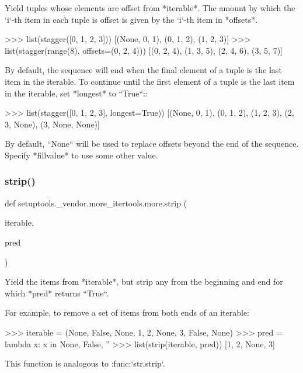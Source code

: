\begin{DoxyVerb}Yield tuples whose elements are offset from *iterable*.
The amount by which the `i`-th item in each tuple is offset is given by
the `i`-th item in *offsets*.

    >>> list(stagger([0, 1, 2, 3]))
    [(None, 0, 1), (0, 1, 2), (1, 2, 3)]
    >>> list(stagger(range(8), offsets=(0, 2, 4)))
    [(0, 2, 4), (1, 3, 5), (2, 4, 6), (3, 5, 7)]

By default, the sequence will end when the final element of a tuple is the
last item in the iterable. To continue until the first element of a tuple
is the last item in the iterable, set *longest* to ``True``::

    >>> list(stagger([0, 1, 2, 3], longest=True))
    [(None, 0, 1), (0, 1, 2), (1, 2, 3), (2, 3, None), (3, None, None)]

By default, ``None`` will be used to replace offsets beyond the end of the
sequence. Specify *fillvalue* to use some other value.\end{DoxyVerb}
 \mbox{\label{namespacesetuptools_1_1__vendor_1_1more__itertools_1_1more_a438cea9758b7e375446ebefb5991b578}} 
\subsubsection{\texorpdfstring{strip()}{strip()}}
{\footnotesize\ttfamily def setuptools.\+\_\+vendor.\+more\+\_\+itertools.\+more.\+strip (\begin{DoxyParamCaption}\item[{}]{iterable,  }\item[{}]{pred }\end{DoxyParamCaption})}

\begin{DoxyVerb}Yield the items from *iterable*, but strip any from the
beginning and end for which *pred* returns ``True``.

For example, to remove a set of items from both ends of an iterable:

    >>> iterable = (None, False, None, 1, 2, None, 3, False, None)
    >>> pred = lambda x: x in {None, False, ''}
    >>> list(strip(iterable, pred))
    [1, 2, None, 3]

This function is analogous to :func:`str.strip`.\end{DoxyVerb}
 \mbox{\label{namespacesetuptools_1_1__vendor_1_1more__itertools_1_1more_a0ac8b3d5da622b2e8e4511742c29d7cf}} 
